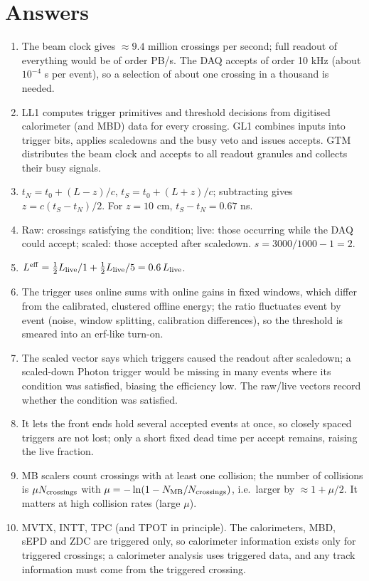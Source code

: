 \documentclass[11pt,letterpaper]{article}
\begin{document}
\section{Answers}
\begin{enumerate}
\item The beam clock gives $\approx9.4$ million crossings per second; full readout of everything would be of order PB/s. The DAQ accepts of order 10 kHz (about $10^{-4}$ s per event), so a selection of about one crossing in a thousand is needed.
\item LL1 computes trigger primitives and threshold decisions from digitised calorimeter (and MBD) data for every crossing. GL1 combines inputs into trigger bits, applies scaledowns and the busy veto and issues accepts. GTM distributes the beam clock and accepts to all readout granules and collects their busy signals.
\item $t_N=t_0+(L-z)/c$, $t_S=t_0+(L+z)/c$; subtracting gives $z=c(t_S-t_N)/2$. For $z=10$ cm, $t_S-t_N=0.67$ ns.
\item Raw: crossings satisfying the condition; live: those occurring while the DAQ could accept; scaled: those accepted after scaledown. $s=3000/1000-1=2$.
\item $L^{\rm eff}=\tfrac12L_{\rm live}/1+\tfrac12L_{\rm live}/5=0.6\,L_{\rm live}$.
\item The trigger uses online sums with online gains in fixed windows, which differ from the calibrated, clustered offline energy; the ratio fluctuates event by event (noise, window splitting, calibration differences), so the threshold is smeared into an erf-like turn-on.
\item The scaled vector says which triggers caused the readout after scaledown; a scaled-down Photon trigger would be missing in many events where its condition was satisfied, biasing the efficiency low. The raw/live vectors record whether the condition was satisfied.
\item It lets the front ends hold several accepted events at once, so closely spaced triggers are not lost; only a short fixed dead time per accept remains, raising the live fraction.
\item MB scalers count crossings with at least one collision; the number of collisions is $\mu N_{\rm crossings}$ with $\mu=-\ln(1-N_{\rm MB}/N_{\rm crossings})$, i.e.\ larger by $\approx1+\mu/2$. It matters at high collision rates (large $\mu$).
\item MVTX, INTT, TPC (and TPOT in principle). The calorimeters, MBD, sEPD and ZDC are triggered only, so calorimeter information exists only for triggered crossings; a calorimeter analysis uses triggered data, and any track information must come from the triggered crossing.

\end{enumerate}
\end{document}
